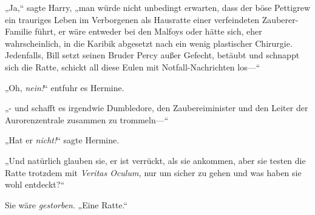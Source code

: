 „Ja,“ sagte Harry, „man würde nicht unbedingt erwarten, dass der böse Pettigrew ein trauriges Leben im Verborgenen als Hausratte einer verfeindeten Zauberer-Familie führt, er wäre entweder bei den Malfoys oder hätte sich, eher wahrscheinlich, in die Karibik abgesetzt nach ein wenig plastischer Chirurgie. Jedenfalls, Bill setzt seinen Bruder Percy außer Gefecht, betäubt und schnappt sich die Ratte, schickt all diese Eulen mit Notfall-Nachrichten los—“

„Oh, \emph{nein!}“ entfuhr es Hermine.

„- und schafft es irgendwie Dumbledore, den Zaubereiminister und den Leiter der Aurorenzentrale zusammen zu trommeln—“

„Hat er \emph{nicht!}“ sagte Hermine.

„Und natürlich glauben sie, er ist verrückt, als sie ankommen, aber sie testen die Ratte trotzdem mit \emph{Veritas Oculum,} nur um sicher zu gehen und was haben sie wohl entdeckt?“%

Sie wäre \emph{gestorben}. „Eine Ratte.“

